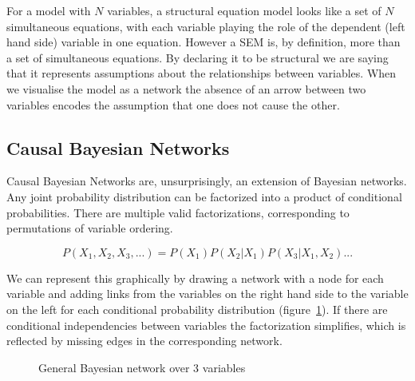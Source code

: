 \documentclass[11pt,a4paper]{article}
\begin{document}
For a model with $N$ variables, a structural equation model looks like a set of $N$ simultaneous equations, with each variable playing the role of the dependent (left hand side) variable in one equation. However a SEM is, by definition, more than a set of simultaneous equations. By declaring it to be structural we are saying that it represents assumptions about the relationships between variables. When we visualise the model as a network the absence of an arrow between two variables encodes the assumption that one does not cause the other.


\subsection{Causal Bayesian Networks}
\label{sec:causalbayesnets}
Causal Bayesian Networks are, unsurprisingly, an extension of Bayesian networks. Any joint probability distribution can be factorized into a product of conditional probabilities. There are multiple valid factorizations, corresponding to permutations of variable ordering.

\begin{equation}
P(X_{1},X_{2},X_{3},...)=P(X_{1})P(X_{2}|X_{1})P(X_{3}|X_{1},X_{2})...
\end{equation}

We can represent this graphically by drawing a network with a node for each variable and adding links from the variables on the right hand side to the variable on the left for each conditional probability distribution (figure~\ref{fig:bayesnet}). If there are conditional independencies between variables the factorization simplifies, which is reflected by missing edges in the corresponding network. 

\begin{figure}[h]
\centering
\caption{General Bayesian network over 3 variables}
\label{fig:bayesnet}
\end{figure}
\end{document}
